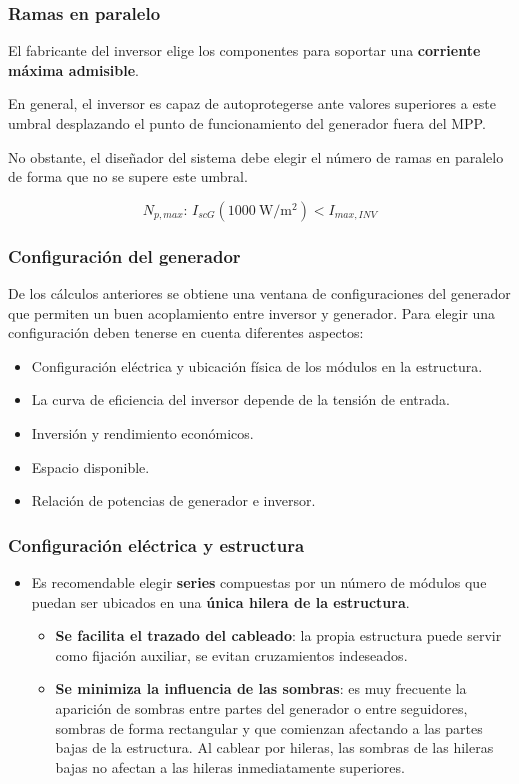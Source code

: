 \documentclass[serif, xcolor=dvipsnames]{beamer}
\begin{document}
\begin{frame}
  \frametitle{Ramas en paralelo}

  El fabricante del inversor elige los componentes para soportar una
  \textbf{corriente máxima admisible}.

  En general, el inversor es capaz de autoprotegerse ante valores
  superiores a este umbral desplazando el punto de funcionamiento del
  generador fuera del MPP.

  No obstante, el diseñador del sistema debe elegir el número de ramas
  en paralelo de forma que no se supere este umbral.
  \begin{block} {}

\[
N_{p,max}:\, I_{scG}(\SI{1000}{\watt\per\meter\squared})<I_{max,INV}\]


\end{block}

\end{frame}
\begin{frame}
  \frametitle{Configuración del generador}

  De los cálculos anteriores se obtiene una ventana de configuraciones
  del generador que permiten un buen acoplamiento entre inversor y
  generador.  Para elegir una configuración deben tenerse en cuenta
  diferentes aspectos:
  \begin{itemize}
  \item Configuración eléctrica y ubicación física de los módulos en
    la estructura.
  \item La curva de eficiencia del inversor depende de la tensión de
    entrada.
  \item Inversión y rendimiento económicos.
  \item Espacio disponible.
  \item Relación de potencias de generador e inversor.
  \end{itemize}

\end{frame}
\begin{frame}
  \frametitle{Configuración eléctrica y estructura}
  \begin{itemize}
  \item Es recomendable elegir \textbf{series} compuestas por un
    número de módulos que puedan ser ubicados en una \textbf{única
      hilera de la estructura}.

    \begin{itemize}
    \item \textbf{Se facilita el trazado del cableado}: la propia
      estructura puede servir como fijación auxiliar, se evitan
      cruzamientos indeseados.
    \item \textbf{Se minimiza la influencia de las sombras}: es muy
      frecuente la aparición de sombras entre partes del generador o
      entre seguidores, sombras de forma rectangular y que comienzan
      afectando a las partes bajas de la estructura. Al cablear por
      hileras, las sombras de las hileras bajas no afectan a las
      hileras inmediatamente superiores.
    \end{itemize}
  \end{itemize}

\end{frame}
\end{document}
